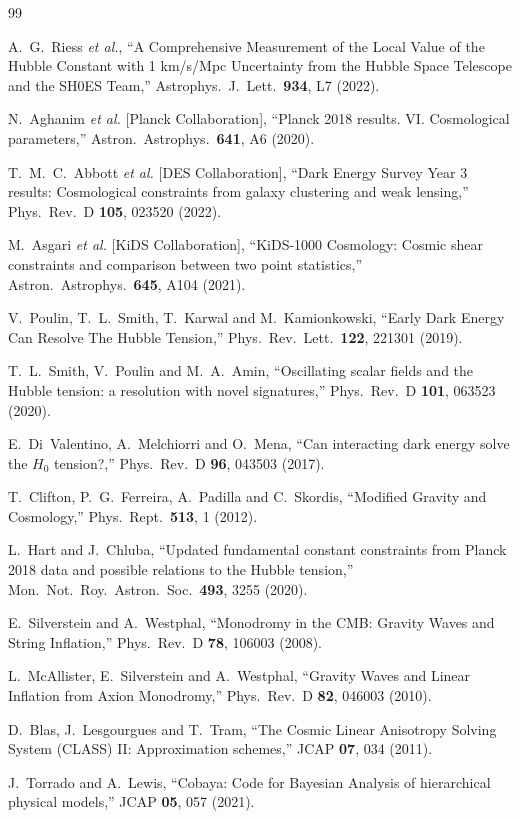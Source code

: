 \documentclass[twocolumn,showpacs,preprintnumbers,amsmath,amssymb,prd]{revtex4-2}
\begin{document}
\begin{thebibliography}{99}

A.~G.~Riess \textit{et al.},
``A Comprehensive Measurement of the Local Value of the Hubble Constant with 1 km/s/Mpc Uncertainty from the Hubble Space Telescope and the SH0ES Team,''
Astrophys.\ J.\ Lett.\ \textbf{934}, L7 (2022).

N.~Aghanim \textit{et al.} [Planck Collaboration],
``Planck 2018 results. VI. Cosmological parameters,''
Astron.\ Astrophys.\ \textbf{641}, A6 (2020).

T.~M.~C.~Abbott \textit{et al.} [DES Collaboration],
``Dark Energy Survey Year 3 results: Cosmological constraints from galaxy clustering and weak lensing,''
Phys.\ Rev.\ D \textbf{105}, 023520 (2022).

M.~Asgari \textit{et al.} [KiDS Collaboration],
``KiDS-1000 Cosmology: Cosmic shear constraints and comparison between two point statistics,''
Astron.\ Astrophys.\ \textbf{645}, A104 (2021).

V.~Poulin, T.~L.~Smith, T.~Karwal and M.~Kamionkowski,
``Early Dark Energy Can Resolve The Hubble Tension,''
Phys.\ Rev.\ Lett.\ \textbf{122}, 221301 (2019).

T.~L.~Smith, V.~Poulin and M.~A.~Amin,
``Oscillating scalar fields and the Hubble tension: a resolution with novel signatures,''
Phys.\ Rev.\ D \textbf{101}, 063523 (2020).

E.~Di~Valentino, A.~Melchiorri and O.~Mena,
``Can interacting dark energy solve the $H_0$ tension?,''
Phys.\ Rev.\ D \textbf{96}, 043503 (2017).

T.~Clifton, P.~G.~Ferreira, A.~Padilla and C.~Skordis,
``Modified Gravity and Cosmology,''
Phys.\ Rept.\ \textbf{513}, 1 (2012).

L.~Hart and J.~Chluba,
``Updated fundamental constant constraints from Planck 2018 data and possible relations to the Hubble tension,''
Mon.\ Not.\ Roy.\ Astron.\ Soc.\ \textbf{493}, 3255 (2020).

E.~Silverstein and A.~Westphal,
``Monodromy in the CMB: Gravity Waves and String Inflation,''
Phys.\ Rev.\ D \textbf{78}, 106003 (2008).

L.~McAllister, E.~Silverstein and A.~Westphal,
``Gravity Waves and Linear Inflation from Axion Monodromy,''
Phys.\ Rev.\ D \textbf{82}, 046003 (2010).

D.~Blas, J.~Lesgourgues and T.~Tram,
``The Cosmic Linear Anisotropy Solving System (CLASS) II: Approximation schemes,''
JCAP \textbf{07}, 034 (2011).

J.~Torrado and A.~Lewis,
``Cobaya: Code for Bayesian Analysis of hierarchical physical models,''
JCAP \textbf{05}, 057 (2021).

\end{thebibliography}
\end{document}
